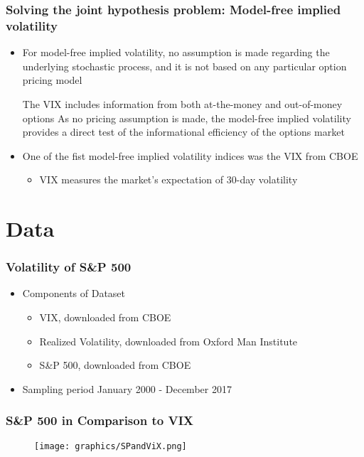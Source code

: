 \documentclass[aspectratio=169]{beamer}
\begin{document}
\begin{frame}
\frametitle{Solving the joint hypothesis problem: Model-free implied volatility}
	\begin{itemize}
	\item For model-free implied volatility, no assumption is made regarding the underlying stochastic process, and it is not based on any particular option pricing model
		\begin{itemize}
		\pro The VIX includes information from both at-the-money and out-of-money options
		\pro As no pricing assumption is made, the model-free implied volatility provides a direct test of the informational efficiency of the options market
		\end{itemize}
	\item One of the fist model-free implied volatility indices was the VIX from CBOE \parencite{exchange2009}
		\begin{itemize}
		\item VIX measures the market's expectation of 30-day volatility
		\end{itemize}
	\end{itemize}
\end{frame}

\section{Data}

\begin{frame}
\frametitle{Volatility of S\&P 500}
	\begin{itemize}
	\item Components of Dataset
		\begin{itemize}
		\item VIX, downloaded from CBOE
		\item Realized Volatility, downloaded from Oxford Man Institute
		\item S\&P 500, downloaded from CBOE
		\end{itemize}
	\item Sampling period January 2000 - December 2017
	\end{itemize}
\end{frame}

\begin{frame}
\frametitle{S\&P 500 in Comparison to VIX}
	\begin{figure}
	\centering
	\texttt{[image: graphics/SPandViX.png]}
	\end{figure}
\end{frame}
\end{document}
